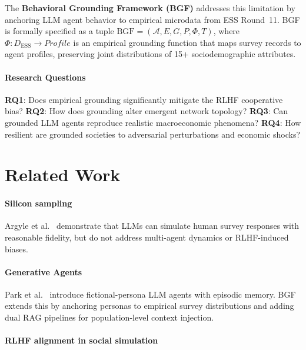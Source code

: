 \documentclass[sigconf,review]{acmart}
\begin{document}
The \textbf{Behavioral Grounding Framework (BGF)} addresses this
limitation by anchoring LLM agent behavior to empirical microdata from
ESS Round~11.  BGF is formally specified as a tuple
$\mathrm{BGF} = (\mathcal{A}, E, G, P, \Phi, T)$, where
$\Phi: D_\text{ESS} \to \mathit{Profile}$ is an empirical grounding
function that maps survey records to agent profiles, preserving joint
distributions of 15+ sociodemographic attributes.

\paragraph{Research Questions}
\textbf{RQ1}: Does empirical grounding significantly mitigate the RLHF
cooperative bias?
\textbf{RQ2}: How does grounding alter emergent network topology?
\textbf{RQ3}: Can grounded LLM agents reproduce realistic macroeconomic
phenomena?
\textbf{RQ4}: How resilient are grounded societies to adversarial
perturbations and economic shocks?

\section{Related Work}


\paragraph{Silicon sampling}
Argyle et al.\ \cite{argyle2023} demonstrate that LLMs can simulate
human survey responses with reasonable fidelity, but do not address
multi-agent dynamics or RLHF-induced biases.

\paragraph{Generative Agents}
Park et al.\ \cite{park2023} introduce fictional-persona LLM agents
with episodic memory.  BGF extends this by anchoring personas to
empirical survey distributions and adding dual RAG pipelines for
population-level context injection.

\paragraph{RLHF alignment in social simulation}

\end{document}
